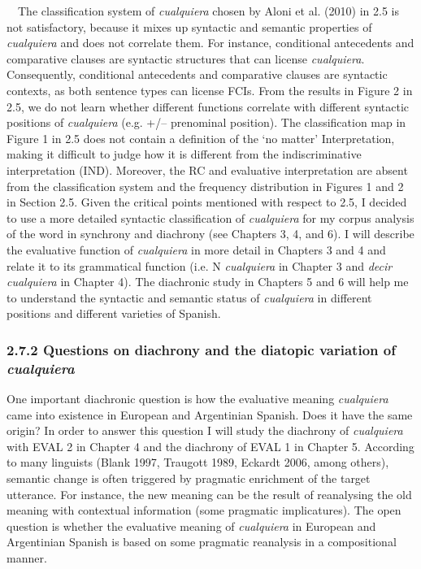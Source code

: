 \begin{styleStandard}
\ \ The classification system of \textit{cualquiera} chosen by Aloni et al. (2010) in 2.5 is not satisfactory, because it mixes up syntactic and semantic properties of \textit{cualquiera} and does not correlate them. For instance, conditional antecedents and comparative clauses are syntactic structures that can license \textit{cualquiera}. Consequently, conditional antecedents and comparative clauses are syntactic contexts, as both sentence types can license FCIs. From the results in Figure 2 in 2.5, we do not learn whether different functions correlate with different syntactic positions of \textit{cualquiera} (e.g. +/– prenominal position). The classification map in Figure 1 in 2.5 does not contain a definition of the ‘no matter’ Interpretation, making it difficult to judge how it is different from the indiscriminative interpretation (IND). Moreover, the RC and evaluative interpretation are absent from the classification system and the frequency distribution in Figures 1 and 2 in Section 2.5. Given the critical points mentioned with respect to 2.5, I decided to use a more detailed syntactic classification of \textit{cualquiera} for my corpus analysis of the word in synchrony and diachrony (see Chapters 3, 4, and 6). I will describe the evaluative function of \textit{cualquiera} in more detail in Chapters 3 and 4 and relate it to its grammatical function (i.e. N \textit{cualquiera} in Chapter 3 and \textit{decir cualquiera} in Chapter 4). The diachronic study in Chapters 5 and 6 will help me to understand the syntactic and semantic status of \textit{cualquiera} in different positions and different varieties of Spanish. 
\end{styleStandard}

\subsubsection[2.7.2 Questions on diachrony and the diatopic variation of cualquiera]{\textbf{2.7.2 Questions on diachrony and the diatopic variation of }\textbf{\textit{cualquiera}}}
\begin{styleStandard}
One important diachronic question is how the evaluative meaning \textit{cualquiera} came into existence in European and Argentinian Spanish. Does it have the same origin? In order to answer this question I will study the diachrony of \textit{cualquiera} with EVAL 2 in Chapter 4 and the diachrony of EVAL 1 in Chapter 5. According to many linguists (Blank 1997, Traugott 1989, Eckardt 2006, among others), semantic change is often triggered by pragmatic enrichment of the target utterance. For instance, the new meaning can be the result of reanalysing the old meaning with contextual information (some pragmatic implicatures). The open question is whether the evaluative meaning of \textit{cualquiera} in European and Argentinian Spanish is based on some pragmatic reanalysis in a compositional manner. 
\end{styleStandard}

